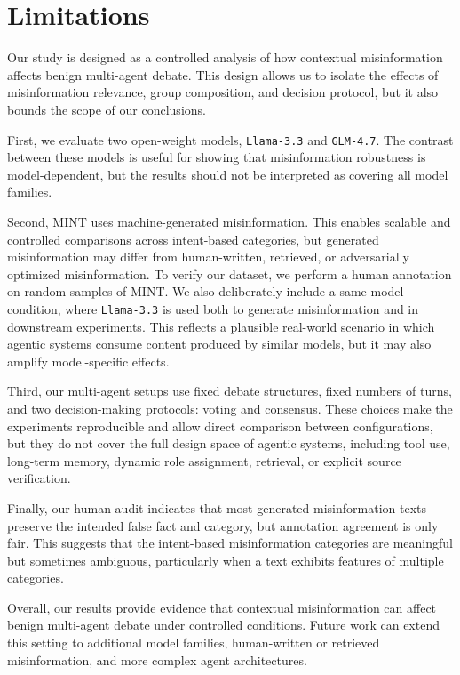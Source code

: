 \documentclass[11pt]{article}
\begin{document}
\section{Limitations}

Our study is designed as a controlled analysis of how contextual misinformation affects benign multi-agent debate. This design allows us to isolate the effects of misinformation relevance, group composition, and decision protocol, but it also bounds the scope of our conclusions.

First, we evaluate two open-weight models, \texttt{Llama-3.3} and \texttt{GLM-4.7}. The contrast between these models is useful for showing that misinformation robustness is model-dependent, but the results should not be interpreted as covering all model families.

Second, MINT uses machine-generated misinformation. This enables scalable and controlled comparisons across intent-based categories, but generated misinformation may differ from human-written, retrieved, or adversarially optimized misinformation. To verify our dataset, we perform a human annotation on random samples of MINT. We also deliberately include a same-model condition, where \texttt{Llama-3.3} is used both to generate misinformation and in downstream experiments. This reflects a plausible real-world scenario in which agentic systems consume content produced by similar models, but it may also amplify model-specific effects.

Third, our multi-agent setups use fixed debate structures, fixed numbers of turns, and two decision-making protocols: voting and consensus. These choices make the experiments reproducible and allow direct comparison between configurations, but they do not cover the full design space of agentic systems, including tool use, long-term memory, dynamic role assignment, retrieval, or explicit source verification.

Finally, our human audit indicates that most generated misinformation texts preserve the intended false fact and category, but annotation agreement is only fair. This suggests that the intent-based misinformation categories are meaningful but sometimes ambiguous, particularly when a text exhibits features of multiple categories.

Overall, our results provide evidence that contextual misinformation can affect benign multi-agent debate under controlled conditions. Future work can extend this setting to additional model families, human-written or retrieved misinformation, and more complex agent architectures.
\end{document}
